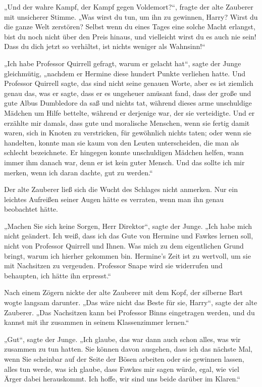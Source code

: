 {„Und der wahre Kampf, der Kampf gegen Voldemort?“, fragte der alte Zauberer mit unsicherer Stimme. „Was wirst du tun, um ihn zu gewinnen, Harry? Wirst du die ganze Welt zerstören? Selbst wenn du eines Tages eine solche Macht erlangst, bist du noch nicht über den Preis hinaus, und vielleicht wirst du es auch nie sein! Dass du dich jetzt so verhältst, ist nichts weniger als Wahnsinn!“

„Ich habe Professor Quirrell gefragt, warum er gelacht hat“, sagte der Junge gleichmütig, „nachdem er Hermine diese hundert Punkte verliehen hatte. Und Professor Quirrell sagte, das sind nicht seine genauen Worte, aber es ist ziemlich genau das, was er sagte, dass er es ungeheuer amüsant fand, dass der große und gute Albus Dumbledore da saß und nichts tat, während dieses arme unschuldige Mädchen um Hilfe bettelte, während er derjenige war, der sie verteidigte. Und er erzählte mir damals, dass gute und moralische Menschen, wenn sie fertig damit waren, sich in Knoten zu verstricken, für gewöhnlich nichts taten; oder wenn sie handelten, konnte man sie kaum von den Leuten unterscheiden, die man als schlecht bezeichnete. Er hingegen konnte unschuldigen Mädchen helfen, wann immer ihm danach war, denn er ist kein guter Mensch. Und das sollte ich mir merken, wenn ich daran dachte, gut zu werden.“

Der alte Zauberer ließ sich die Wucht des Schlages nicht anmerken. Nur ein leichtes Aufreißen seiner Augen hätte es verraten, wenn man ihn genau beobachtet hätte.

„Machen Sie sich keine Sorgen, Herr Direktor“, sagte der Junge. „Ich habe mich nicht geändert. Ich weiß, dass ich das Gute von Hermine und Fawkes lernen soll, nicht von Professor Quirrell und Ihnen. Was mich zu dem eigentlichen Grund bringt, warum ich hierher gekommen bin. Hermine's Zeit ist zu wertvoll, um sie mit Nachsitzen zu vergeuden. Professor Snape wird sie widerrufen und behaupten, ich hätte ihn erpresst.“

Nach einem Zögern nickte der alte Zauberer mit dem Kopf, der silberne Bart wogte langsam darunter. „Das wäre nicht das Beste für sie, Harry“, sagte der alte Zauberer. „Das Nachsitzen kann bei Professor Binns eingetragen werden, und du kannst mit ihr zusammen in seinem Klassenzimmer lernen.“

„Gut“, sagte der Junge. „Ich glaube, das war dann auch schon alles, was wir zusammen zu tun hatten. Sie können davon ausgehen, dass ich das nächste Mal, wenn Sie scheinbar auf der Seite der Bösen arbeiten oder sie gewinnen lassen, alles tun werde, was ich glaube, dass Fawkes mir sagen würde, egal, wie viel Ärger dabei herauskommt. Ich hoffe, wir sind uns beide darüber im Klaren.“

}
